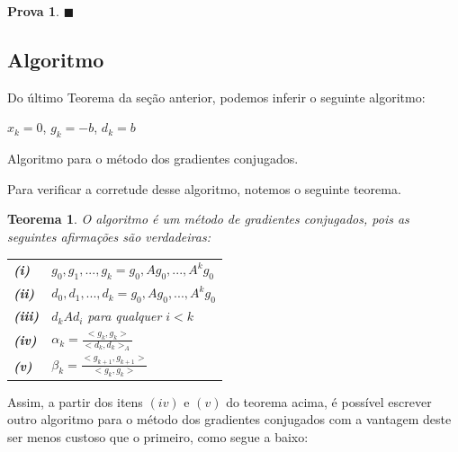 \documentclass [a4paper,10pt]{article}
\newcommand{\n}[1]{\textbf{#1}}
\newtheorem{te}{Teorema}
\newtheorem{pa}{Prova}
\begin{document}
{\begin{pa}
        \hfill$\blacksquare$
    \end{pa}

    \subsection{Algoritmo}
    Do último Teorema da seção anterior, podemos inferir o seguinte algoritmo:

    \begin{algorithm}[!hb]
        $x_k = 0$, $g_k = -b$, $d_k = b$\\
        \caption{\small Algoritmo para  o método dos gradientes conjugados.}
    \end{algorithm}

    Para verificar a corretude desse algoritmo, notemos o seguinte teorema.

    \begin{te}
        O algoritmo é um método de gradientes conjugados, pois as seguintes afirmações são verdadeiras:\\
            \begin{tabular}{l l}    
                \hspace{2.5cm}\n{(i)}   & ${g_0, g_1, ..., g_k} = {g_0, Ag_0, ..., A^kg_0}$\\
                \hspace{2.5cm}\n{(ii)}  & ${d_0, d_1, ..., d_k} = {g_0, Ag_0, ..., A^kg_0}$\\
                \hspace{2.5cm}\n{(iii)} & $d_kAd_i$ para qualquer $i < k$\\
                \hspace{2.5cm}\n{(iv)}  & $\alpha_k = \frac{<g_k, g_k>}{<d_k, d_k>_A}$\\
                \hspace{2.5cm}\n{(v)}   & $\beta_k = \frac{<g_{k + 1}, g_{k + 1}>}{<g_k, g_k>}$
            \end{tabular}
    \end{te}

    Assim, a partir dos itens $(iv)$ e $(v)$ do teorema acima, é possível escrever outro algoritmo para o método dos
    gradientes conjugados com a vantagem deste ser menos custoso que o primeiro, como segue a baixo:

}
\end{document}
